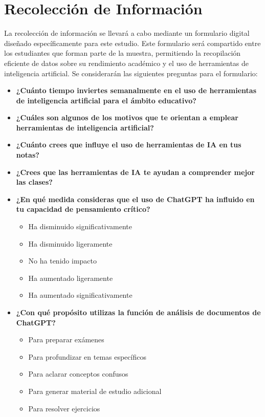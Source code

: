 \documentclass{article}
\begin{document}
\newpage

\section{Recolección de Información}

La recolección de información se llevará a cabo mediante un formulario digital diseñado específicamente para este estudio. Este formulario será compartido entre los estudiantes que forman parte de la muestra, permitiendo la recopilación eficiente de datos sobre su rendimiento académico y el uso de herramientas de inteligencia artificial. Se considerarán las siguientes preguntas para el formulario:

\begin{itemize}
    \item \textbf{¿Cuánto tiempo inviertes semanalmente en el uso de herramientas de inteligencia artificial para el ámbito educativo?}
    \item \textbf{¿Cuáles son algunos de los motivos que te orientan a emplear herramientas de inteligencia artificial?}
    \item \textbf{¿Cuánto crees que influye el uso de herramientas de IA en tus notas?}
    \item \textbf{¿Crees que las herramientas de IA te ayudan a comprender mejor las clases?}
    \item \textbf{¿En qué medida consideras que el uso de ChatGPT ha influido en tu capacidad de pensamiento crítico?}
    \begin{itemize}
        \item Ha disminuido significativamente
        \item Ha disminuido ligeramente
        \item No ha tenido impacto
        \item Ha aumentado ligeramente
        \item Ha aumentado significativamente
    \end{itemize}
    \item \textbf{¿Con qué propósito utilizas la función de análisis de documentos de ChatGPT?}
    \begin{itemize}
        \item Para preparar exámenes
        \item Para profundizar en temas específicos
        \item Para aclarar conceptos confusos
        \item Para generar material de estudio adicional
        \item Para resolver ejercicios
    \end{itemize}
\end{itemize}
\end{document}
